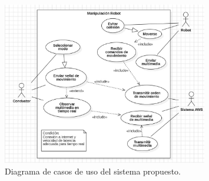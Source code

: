            \begin{figure}[htbp]
                \centering
                \includegraphics[width=0.8\textwidth]{images/desarrollo/diagramas/CasosDeUso.jpeg}
                \caption{Diagrama de casos de uso del sistema propuesto.}
                \label{fig:CasosDeUso}
            \end{figure}
        \vskip 0.5cm
